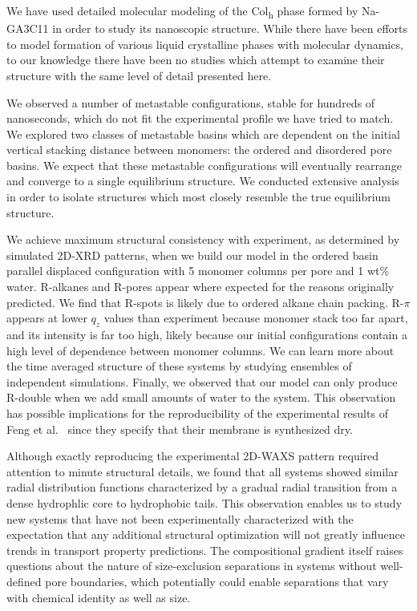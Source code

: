 \documentclass[journal=jpcbfk,manuscript=article]{achemso}
\begin{document}
  We have used detailed molecular modeling of the Col\textsubscript{h} phase
  formed by Na-GA3C11 in order to study its nanoscopic structure. While there
  have been efforts to model formation of various liquid crystalline phases with
  molecular dynamics, to our knowledge there have been no studies which attempt
  to examine their structure with the same level of detail presented here.
  
  We observed a number of metastable configurations, stable for hundreds of 
  nanoseconds, which do not fit the experimental profile we have tried to match. 
  We explored two classes of metastable basins which are dependent on the initial
  vertical stacking distance between monomers: the ordered and disordered pore basins.
  We expect that these metastable configurations will eventually rearrange and converge
  to a single equilibrium structure. We conducted extensive analysis in order to 
  isolate structures which most closely resemble the true equilibrium structure.

  We achieve maximum structural consistency with experiment, as determined by
  simulated 2D-XRD patterns, when we build our model in the ordered basin
  parallel displaced configuration with 5 monomer columns per pore and 1 wt\%
  water. R-alkanes and R-pores appear where expected for the reasons originally
  predicted. We find that R-spots is likely due to ordered alkane chain packing.
  R-$\pi$ appears at lower $q_z$ values than experiment because monomer stack too far
  apart, and its intensity is far too high, likely because our initial
  configurations contain a high level of dependence between monomer columns.
  We can learn more about the time averaged structure of these systems by studying
  ensembles of independent simulations. Finally, we observed that our model can 
  only produce R-double when we add small amounts of water to the system. This 
  observation has possible implications for the reproducibility of the experimental
  results of Feng et al.~\cite{feng_scalable_2014,feng_thin_2016} since they
  specify that their membrane is synthesized dry.  

  Although exactly reproducing the experimental 2D-WAXS pattern required
  attention to minute structural details, we found that all systems showed
  similar radial distribution functions characterized by a gradual radial
  transition from a dense hydrophlic core to hydrophobic tails. This observation
  enables us to study new systems that have not been experimentally characterized
  with the expectation that any additional structural optimization will not
  greatly influence trends in transport property predictions. The compositional
  gradient itself raises questions about the nature of size-exclusion separations
  in systems without well-defined pore boundaries, which potentially could enable
  separations that vary with chemical identity as well as size. 
\end{document}

